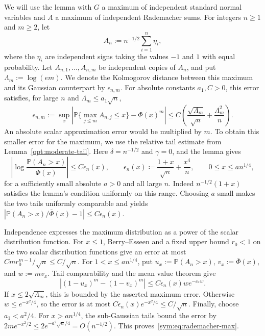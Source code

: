 \documentclass[11pt,letterpaper]{article}
\newenvironment{recovered}{\color{magenta}}{}
\theoremstyle{remark}
\newcommand{\Pp}{\mathbb P}
\begin{document}
We will use the lemma with \(G\) a maximum of independent standard
normal variables and \(A\) a maximum of independent Rademacher sums.
For integers \(n\ge1\) and \(m\ge2\), let
\[
 A_n:=n^{-1/2}\sum_{i=1}^n\eta_i,
\]
where the \(\eta_i\) are independent signs taking the values
\(-1\) and \(1\) with equal probability. Let
\(A_{n,1},\ldots,A_{n,m}\) be independent copies of \(A_n\), and put
\(\Lambda_m:=\log(em)\).
\begin{recovered}
We denote the Kolmogorov distance between this maximum and its
Gaussian counterpart by \(\epsilon_{n,m}\). For absolute constants
\(a_1,C>0\), this error satisfies, for large \(n\) and
\(\Lambda_m\le a_1\sqrt n\),
\end{recovered}
\begin{equation}
 \epsilon_{n,m}:=\sup_x\left|\Pp\{\max_{j\le m}A_{n,j}\le x\}-\Phi(x)^m\right|
 \le C\left(\frac{\sqrt{\Lambda_m}}{\sqrt n}
                 +\frac{\Lambda_m^2}{n}\right).
 \label{sym:eq:rademacher-max}
\end{equation}
An absolute scalar approximation error would be multiplied by \(m\).
To obtain this smaller error for the maximum, we use the relative
tail estimate from Lemma~\ref{opt:moderate-tail}. Here
\(\delta=n^{-1/2}\) and \(\gamma=0\), and the lemma gives
\[
 \left|\log\frac{\Pp(A_n>x)}{\bar\Phi(x)}\right|
 \le C\epsilon_n(x),\qquad
 \epsilon_n(x)\coloneqq\frac{1+x}{\sqrt n}+\frac{x^4}{n},
 \qquad 0\le x\le an^{1/4},
\]
for a sufficiently small absolute \(a>0\) and all large \(n\).
Indeed \(n^{-1/2}(1+x)\) satisfies the lemma's condition uniformly
on this range. Choosing \(a\) small makes the two tails uniformly
comparable and yields
\(\left|\Pp(A_n>x)/\bar\Phi(x)-1\right|\le C\epsilon_n(x)\).

Independence expresses the maximum distribution as a power of the
scalar distribution function. For \(x\le1\),
Berry--Esseen and a fixed upper bound \(r_0<1\) on the two scalar
distribution functions give an error at most
\(Cm r_0^{m-1}/\sqrt n\le C/\sqrt n\). For
\(1<x\le an^{1/4}\), put \(u_x:=\Pp(A_n>x)\),
\(v_x:=\bar\Phi(x)\), and \(w:=mv_x\).
Tail comparability and the mean value theorem give
\[
 |(1-u_x)^m-(1-v_x)^m|\le C\epsilon_n(x)w e^{-c_*w}.
\]
If \(x\le2\sqrt{\Lambda_m}\), this is bounded by the asserted
maximum error. Otherwise \(w\le e^{-x^2/4}\), so the error is
at most \(C\epsilon_n(x)e^{-x^2/4}\le C/\sqrt n\).
Finally, choose \(a_1<a^2/4\). For \(x>an^{1/4}\), the
sub-Gaussian tails bound the error by
\(2m e^{-x^2/2}\le2e^{-a^2\sqrt n/4}=O(n^{-1/2})\).
This proves~\eqref{sym:eq:rademacher-max}.
\end{document}
